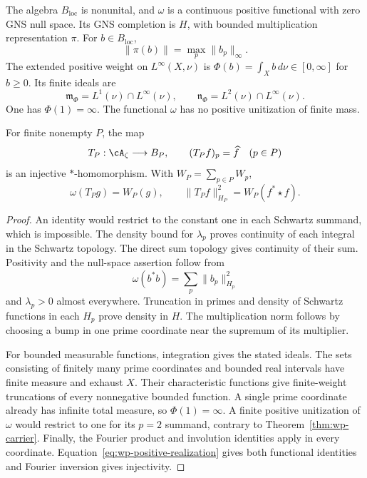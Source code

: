 \begin{proposition}
\label{prop:wc-weight}
The algebra $B_{\mathrm{loc}}$ is nonunital, and $\omega$ is a continuous
positive functional with zero GNS null space.
Its GNS completion is $H$, with bounded multiplication representation $\pi$.
For $b\in B_{\mathrm{loc}}$,
\[
 \|\pi(b)\|=\max_p\|b_p\|_\infty.
\]
The extended positive weight on $L^\infty(X,\nu)$ is
$\Phi(b)=\int_X b\,d\nu\in[0,\infty]$ for $b\geq0$.
Its finite ideals are
\[
 \mathfrak m_\Phi=L^1(\nu)\cap L^\infty(\nu),\qquad
 \mathfrak n_\Phi=L^2(\nu)\cap L^\infty(\nu).
\]
One has $\Phi(1)=\infty$.
The functional $\omega$ has no positive unitization of finite mass.

For finite nonempty $P$, the map
\begin{equation}
 T_P:\cA_\zeta\longrightarrow B_P,\qquad
 (T_Pf)_p=\widehat f\quad(p\in P)
 \label{eq:wc-arithmetic-map}
\end{equation}
is an injective $*$-homomorphism.  With $W_P=\sum_{p\in P}W_p$,
\[
 \omega(T_Pg)=W_P(g),\qquad
 \|T_Pf\|_{H_P}^2=W_P(f^*\star f).
\]
\end{proposition}
\begin{proof}
An identity would restrict to the constant one in each Schwartz summand,
which is impossible.  The density bound for $\lambda_p$ proves continuity
of each integral in the Schwartz topology.  The direct sum topology gives
continuity of their sum.  Positivity and the null-space assertion follow
from
\[
 \omega(b^*b)=\sum_p\|b_p\|_{H_p}^2
\]
and $\lambda_p>0$ almost everywhere.
Truncation in primes and density of Schwartz functions in each $H_p$
prove density in $H$.  The multiplication norm follows by choosing a
bump in one prime coordinate near the supremum of its multiplier.

For bounded measurable functions, integration gives the stated ideals.
The sets consisting of finitely many prime coordinates and bounded real
intervals have finite measure and exhaust $X$.
Their characteristic functions give finite-weight truncations of every
nonnegative bounded function.  A single prime coordinate already has
infinite total measure, so $\Phi(1)=\infty$.
A finite positive unitization of $\omega$ would restrict to one for its
$p=2$ summand, contrary to Theorem~\ref{thm:wp-carrier}.
Finally, the Fourier product and involution identities apply in every
coordinate.  Equation~\eqref{eq:wp-positive-realization} gives both
functional identities and Fourier inversion gives injectivity.
\end{proof}

